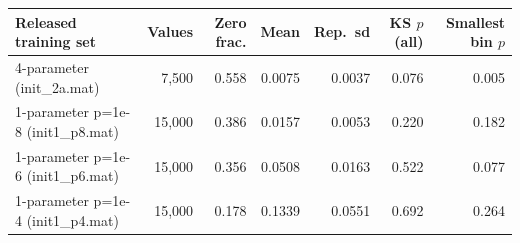 \begin{tabular}{lrrrrrr}
\toprule
Released training set & Values & Zero frac. & Mean & Rep.\ sd & KS $p$ (all) & Smallest bin $p$ \\
\midrule
4-parameter (init\_2a.mat) & 7{,}500 & 0.558 & 0.0075 & 0.0037 & 0.076 & 0.005 \\
1-parameter p=1e-8 (init1\_p8.mat) & 15{,}000 & 0.386 & 0.0157 & 0.0053 & 0.220 & 0.182 \\
1-parameter p=1e-6 (init1\_p6.mat) & 15{,}000 & 0.356 & 0.0508 & 0.0163 & 0.522 & 0.077 \\
1-parameter p=1e-4 (init1\_p4.mat) & 15{,}000 & 0.178 & 0.1339 & 0.0551 & 0.692 & 0.264 \\
\bottomrule
\end{tabular}
